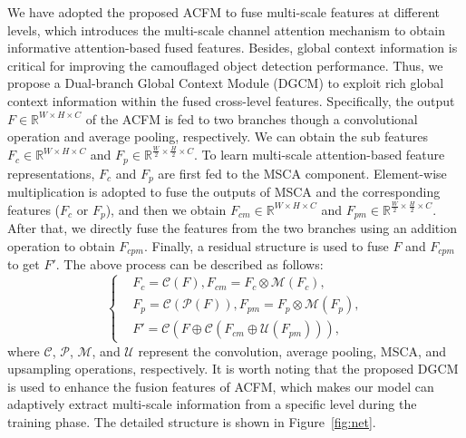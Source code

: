\documentclass{article}
\begin{document}


We have adopted the proposed ACFM to fuse multi-scale features at different levels, which introduces the multi-scale channel attention mechanism to obtain informative attention-based fused features. Besides, global context information is critical for improving the camouflaged object detection performance. Thus, we propose a Dual-branch Global Context Module (DGCM) to exploit rich global context information within the fused cross-level features. Specifically, the output $F\in\mathbb{R}^{{W}\times{H}\times{C}}$ of the ACFM is fed to two branches though a convolutional operation and average pooling, respectively. We can obtain the sub features $F_{c}\in\mathbb{R}^{{W}\times{H}\times{C}}$ and $F_{p}\in\mathbb{R}^{{\frac{W}{2}}\times{\frac{H}{2}}\times{C}}$. To learn multi-scale attention-based feature representations, $F_{c}$ and $F_{p}$ are first fed to the MSCA component. Element-wise multiplication is adopted to fuse the outputs of MSCA and the corresponding features ($F_{c}$ or $F_{p}$), and then we obtain $F_{cm}\in\mathbb{R}^{{W}\times{H}\times{C}}$ and $F_{pm}\in\mathbb{R}^{{\frac{W}{2}}\times{\frac{H}{2}}\times{C}}$. After that, we directly fuse the features from the two branches using an addition operation to obtain $F_{cpm}$. Finally, a residual structure is used to fuse $F$ and $F_{cpm}$ to get ${F}'$. The above process can be described as follows:
\begin{equation}
\left\{
\begin{aligned}
&F_{c}= \mathcal{C}\left ( F \right ), F_{cm}= F_{c}\otimes \mathcal{M}\left ( F_{c} \right ),\\
&F_{p}= \mathcal{C}\left( \mathcal{P} \left ( F \right )\right), F_{pm}= F_{p}\otimes \mathcal{M} \left ( F_{p} \right ),\\
&{F}'= \mathcal{C} \left ( F\oplus \mathcal {C} \left ( F_{cm} \oplus \mathcal{U} \left ( F_{pm} \right )\right ) \right ),
\end{aligned}
\right.
\label{eq01}
\end{equation}
where $\mathcal{C}$, $\mathcal{P}$, $\mathcal{M}$, and $\mathcal{U}$ represent the convolution, average pooling, MSCA, and upsampling operations, respectively.
It is worth noting that the proposed DGCM is used to enhance the fusion features of ACFM, which makes our model can adaptively extract multi-scale information from a specific level during the training phase. The detailed structure is shown in Figure~\ref{fig:net}.
\end{document}

